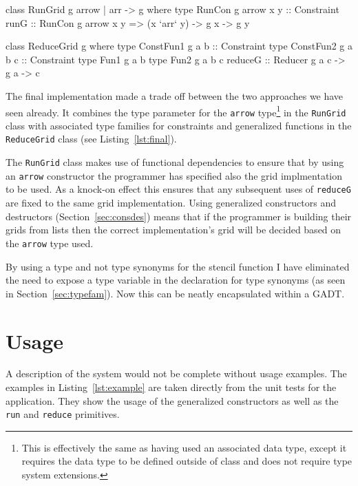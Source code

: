 \documentclass[12pt,a4paper,twoside]{scrbook}
\begin{document}
\begin{hflisting}[label=lst:final, caption={The final signatures of the
  \texttt{RunGrid} and \texttt{ReduceGrid} classes.}]
class RunGrid g arrow | arr -> g where
    type RunCon g arrow x y :: Constraint
    runG :: RunCon g arrow x y =>
            (x `arr` y)
            -> g x -> g y

class ReduceGrid g where
    type ConstFun1 g a b :: Constraint
    type ConstFun2 g a b c :: Constraint
    type Fun1 g a b
    type Fun2 g a b c
    reduceG :: Reducer g a c -> g a -> c
\end{hflisting}

The final implementation made a trade off between the two approaches we have
seen already. It combines the type parameter for the \texttt{arrow}
type\footnote{This is effectively the same as having used an associated data
  type, except it requires the data type to be defined outside of class and
  does not require type system extensions.} in the \texttt{RunGrid} class with
associated type families for constraints and generalized functions in the
\texttt{ReduceGrid} class (see Listing~\ref{lst:final}).

The \texttt{RunGrid} class makes use of functional dependencies to ensure that
by using an \texttt{arrow} constructor the programmer has specified also the grid
implmentation to be used. As a knock-on effect this ensures that any subsequent
uses of \texttt{reduceG} are fixed to the same grid implementation. Using
generalized constructors and destructors (Section~\ref{sec:consdes}) means that
if the programmer is building their grids from lists then the correct
implementation's grid will be decided based on the \texttt{arrow} type used.

By using a type and not type synonyms for the stencil function I have eliminated
the need to expose a type variable in the declaration for type synonyms (as seen
in Section~\ref{sec:typefam}). Now this can be neatly encapsulated within a
GADT.

\section{Usage}

A description of the system would not be complete without usage examples. The
examples in Listing~\ref{lst:example} are taken directly from the unit tests for
the application. They show the usage of the generalized constructors as well as
the \texttt{run} and \texttt{reduce} primitives.
\end{document}
